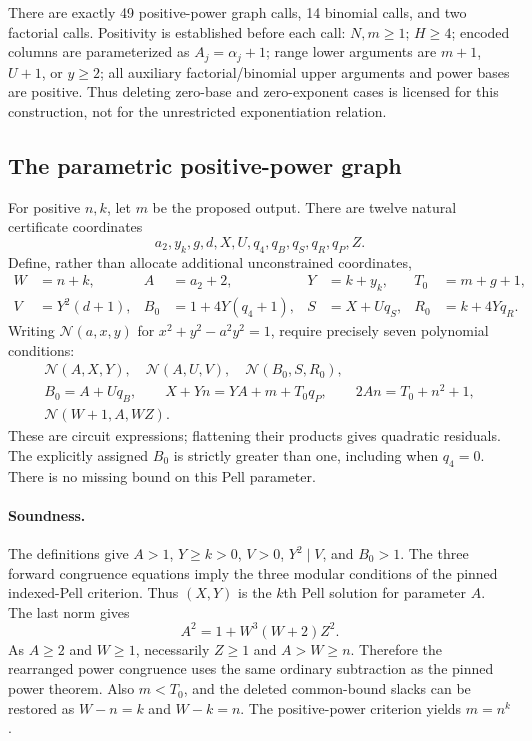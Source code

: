 There are exactly 49 positive-power graph calls, 14 binomial calls, and
two factorial calls.  Positivity is established before each call:
$N,m\ge1$; $H\ge4$; encoded columns are parameterized as $A_j=\alpha_j+1$;
range lower arguments are $m+1$, $U+1$, or $y\ge2$; all auxiliary
factorial/binomial upper arguments and power bases are positive.
Thus deleting zero-base and zero-exponent cases is licensed for this
construction, not for the unrestricted exponentiation relation.

\subsection{The parametric positive-power graph}

For positive $n,k$, let $m$ be the proposed output.  There are twelve
natural certificate coordinates
\[
 a_2,y_k,g,d,X,U,q_4,q_B,q_S,q_R,q_P,Z.
\]
Define, rather than allocate additional unconstrained coordinates,
\begin{align*}
 W&=n+k,& A&=a_2+2,& Y&=k+y_k,& T_0&=m+g+1,\\
 V&=Y^2(d+1),& B_0&=1+4Y(q_4+1),&
 S&=X+Uq_S,& R_0&=k+4Yq_R.
\end{align*}
Writing $\mathcal N(a,x,y)$ for
$x^2+y^2-a^2y^2=1$, require precisely seven polynomial conditions:
\begin{gather*}
 \mathcal N(A,X,Y),\quad \mathcal N(A,U,V),\quad
 \mathcal N(B_0,S,R_0),\\
 B_0=A+Uq_B,\qquad
 X+Yn=YA+m+T_0q_P,\qquad 2An=T_0+n^2+1,\\
 \mathcal N(W+1,A,WZ). \tag{10}
\end{gather*}
These are circuit expressions; flattening their products gives quadratic
residuals.  The explicitly assigned $B_0$ is strictly greater than one,
including when $q_4=0$.  There is no missing bound on this Pell parameter.

\paragraph{Soundness.}
The definitions give $A>1$, $Y\ge k>0$, $V>0$, $Y^2\mid V$, and
$B_0>1$.  The three forward congruence equations imply the three modular
conditions of the pinned indexed-Pell criterion.  Thus $(X,Y)$ is the
$k$th Pell solution for parameter $A$.  The last norm gives
\[
 A^2=1+W^3(W+2)Z^2.
\]
As $A\ge2$ and $W\ge1$, necessarily $Z\ge1$ and $A>W\ge n$.
Therefore the rearranged power congruence uses the same ordinary
subtraction as the pinned power theorem.  Also $m<T_0$, and the deleted
common-bound slacks can be restored as $W-n=k$ and $W-k=n$.
The positive-power criterion yields $m=n^k$.

